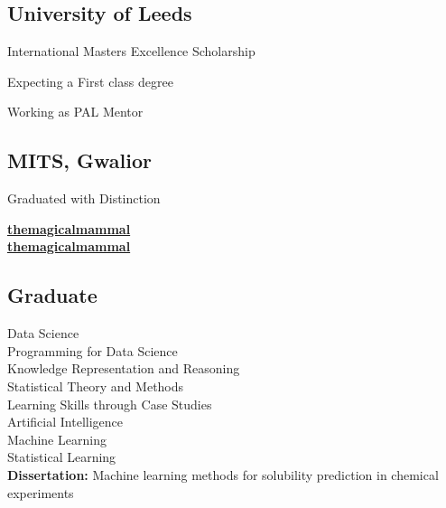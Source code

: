 \documentclass[a4paper]{themagicaltemplate}
\begin{document}
\lastupdated


\begin{minipage}[t]{0.33\textwidth} 


\subsection{University of Leeds}
\vspace{\topsep} %
\begin{tightemize}
\item International Masters Excellence Scholarship
\item Expecting a First class degree
\item Working as PAL Mentor
\end{tightemize}
\sectionsep

\subsection{MITS, Gwalior}
Graduated with Distinction
\sectionsep


 \href{https://github.com/themagicalmammal}{\bf themagicalmammal} \\
 \href{https://www.linkedin.com/in/themagicalmammal/}{\bf themagicalmammal}
\sectionsep


\subsection{Graduate}
Data Science \\
Programming for Data Science \\
Knowledge Representation and Reasoning \\
Statistical Theory and Methods \\
Learning Skills through Case Studies \\
Artificial Intelligence \\
Machine Learning \\
Statistical Learning \\ 
\textbf{Dissertation: }
Machine learning methods for solubility prediction in chemical experiments
\sectionsep


\end{minipage}
\end{document}
